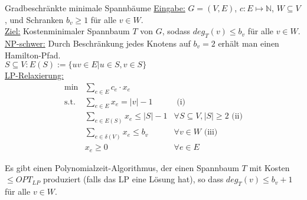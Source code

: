 \begin{section}{Gradbeschränkte minimale Spannbäume}
\underline{Eingabe:} $G=(V,E)$, $c: E \mapsto \mathbb{N}$, $W\subseteq V$, und Schranken $b_v \geq 1$ für alle $v\in W$.\\
\underline{Ziel:} Kostenminimaler Spannbaum $T$ von $G$, sodass $deg_T(v) \leq b_v$ für alle $v\in W$.
\underline{NP-schwer:} Durch Beschränkung jedes Knotens auf $b_v = 2$ erhält man einen Hamilton-Pfad.\\
$S \subseteq V: E(S) := \{uv \in E | u\in S,v\in S\}$\\
\underline{LP-Relaxierung:} 
\begin{align*}
 \min&\sum_{e\in E} c_e \cdot x_e\\
 \text{s.t. }&\sum_{e\in E} x_e = |v| -1 &\text{     (i)}\\
 &\sum_{e\in E(S)} x_e \leq |S| -1 &\forall S \subseteq V, |S| \geq 2\text{     (ii)}\\
 &\sum_{e\in \delta(V)} x_e \leq b_v &\forall v\in W\text{     (iii)}\\ 
 &x_e \geq 0 &\forall e \in E
\end{align*}
\begin{satz}[14.1] \label{141}
 Es gibt einen Polynomialzeit-Algorithmus, der einen Spannbaum $T$ mit Kosten $\leq OPT_{LP}$ produziert (falls das LP eine Lösung hat), so dass $deg_T(v) \leq b_v +1 $ für alle $v\in W$.
\end{satz}
\end{section}